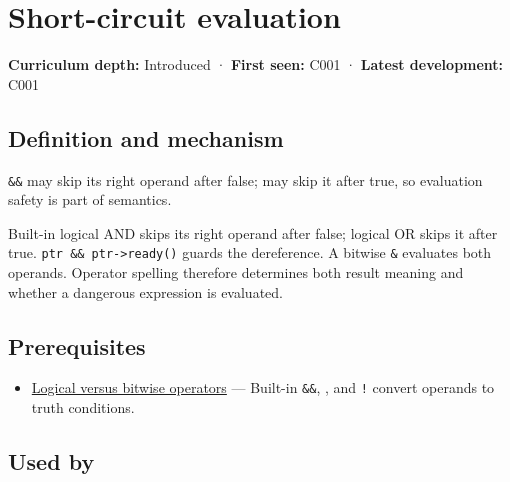 \hypertarget{appendix-2e245a6fa8d3}{}\label{referencestart:appendix-2e245a6fa8d3}
\section{Short-circuit evaluation}\label{appendix-2e245a6fa8d3-short-circuit-evaluation}

\hypertarget{appendix-2e245a6fa8d3-short-circuit-evaluation}{}

\textbf{Curriculum depth:} Introduced · \textbf{First seen:} C001 · \textbf{Latest development:} C001

\begin{allmightroledefinition}

\subsection{Definition and mechanism}\label{appendix-2e245a6fa8d3-definition-and-mechanism}

\hypertarget{appendix-2e245a6fa8d3-definition-and-mechanism}{}

\texttt{\&\&} may skip its right operand after false; \texttt{\textbar{}\textbar{}} may skip it after true, so evaluation safety is part of semantics.

\end{allmightroledefinition}

Built-in logical AND skips its right operand after false; logical OR skips it after true. \texttt{ptr\ \&\&\ ptr-\textgreater{}ready()} guards the dereference. A bitwise \texttt{\&} evaluates both operands. Operator spelling therefore determines both result meaning and whether a dangerous expression is evaluated.

\subsection{Prerequisites}\label{appendix-2e245a6fa8d3-prerequisites}

\hypertarget{appendix-2e245a6fa8d3-prerequisites}{}

\begin{itemize}
\tightlist
\item
  \hyperref[appendix-fe6b457d68d8]{Logical versus bitwise operators} --- Built-in \texttt{\&\&}, \texttt{\textbar{}\textbar{}}, and \texttt{!} convert operands to truth conditions.
\end{itemize}

\subsection{Used by}\label{appendix-2e245a6fa8d3-used-by}

